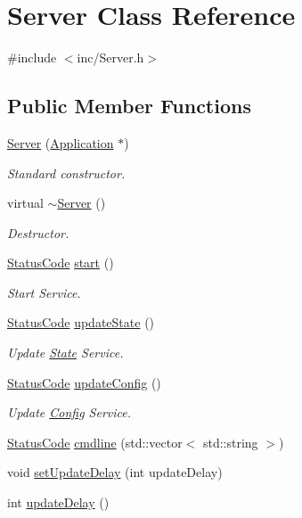 \hypertarget{classServer}{
\section{Server Class Reference}
\label{classServer}
}


{\ttfamily \#include $<$inc/Server.h$>$}\subsection*{Public Member Functions}
\begin{DoxyCompactItemize}
\item 
\hyperlink{classServer_ac808c867e64a7f139b1958abeb387a15}{Server} (\hyperlink{classApplication}{Application} $\ast$)
\begin{DoxyCompactList}\small\item\em Standard constructor. \item\end{DoxyCompactList}\item 
virtual \hyperlink{classServer_a4b3aa2579cb1c8cd1d069582c14d0fa6}{$\sim$Server} ()
\begin{DoxyCompactList}\small\item\em Destructor. \item\end{DoxyCompactList}\item 
\hyperlink{classStatusCode}{StatusCode} \hyperlink{classServer_a039cc5b24c26fa5bb8145335f27bb28e}{start} ()
\begin{DoxyCompactList}\small\item\em Start Service. \item\end{DoxyCompactList}\item 
\hyperlink{classStatusCode}{StatusCode} \hyperlink{classServer_abaa0b878f4f96454339f1989ec12cc6b}{updateState} ()
\begin{DoxyCompactList}\small\item\em Update \hyperlink{classState}{State} Service. \item\end{DoxyCompactList}\item 
\hyperlink{classStatusCode}{StatusCode} \hyperlink{classServer_af58d60a5587813e2aab7fc9016dfa01a}{updateConfig} ()
\begin{DoxyCompactList}\small\item\em Update \hyperlink{classConfig}{Config} Service. \item\end{DoxyCompactList}\item 
\hyperlink{classStatusCode}{StatusCode} \hyperlink{classServer_adc7d38a333b12fbe03db3d209f5feae9}{cmdline} (std::vector$<$ std::string $>$)
\item 
void \hyperlink{classServer_ac885fb635733c69a28fe3ec9bd21eac5}{setUpdateDelay} (int updateDelay)
\item 
int \hyperlink{classServer_ac3b91a1bf06dab7911e6d1b867d677bc}{updateDelay} ()
\end{DoxyCompactItemize}
